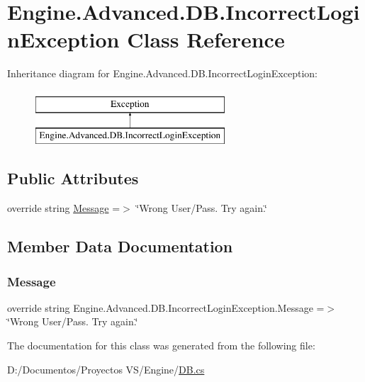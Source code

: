 \hypertarget{class_engine_1_1_advanced_1_1_d_b_1_1_incorrect_login_exception}{}\section{Engine.\+Advanced.\+D\+B.\+Incorrect\+Login\+Exception Class Reference}
\label{class_engine_1_1_advanced_1_1_d_b_1_1_incorrect_login_exception}
Inheritance diagram for Engine.\+Advanced.\+D\+B.\+Incorrect\+Login\+Exception\+:\begin{figure}[H]
\begin{center}
\leavevmode
\includegraphics[height=2.000000cm]{class_engine_1_1_advanced_1_1_d_b_1_1_incorrect_login_exception}
\end{center}
\end{figure}
\subsection*{Public Attributes}
\begin{DoxyCompactItemize}
\item 
override string \mbox{\hyperlink{class_engine_1_1_advanced_1_1_d_b_1_1_incorrect_login_exception_a7efbd78cdb9fee5879444bf2c361e9ca}{Message}} =$>$ \char`\"{}Wrong User/Pass. Try again.\char`\"{}
\end{DoxyCompactItemize}


\subsection{Member Data Documentation}
\mbox{\label{class_engine_1_1_advanced_1_1_d_b_1_1_incorrect_login_exception_a7efbd78cdb9fee5879444bf2c361e9ca}} 
\subsubsection{\texorpdfstring{Message}{Message}}
{\footnotesize\ttfamily override string Engine.\+Advanced.\+D\+B.\+Incorrect\+Login\+Exception.\+Message =$>$ \char`\"{}Wrong User/Pass. Try again.\char`\"{}}



The documentation for this class was generated from the following file\+:\begin{DoxyCompactItemize}
\item 
D\+:/\+Documentos/\+Proyectos V\+S/\+Engine/\mbox{\hyperlink{_d_b_8cs}{D\+B.\+cs}}\end{DoxyCompactItemize}

